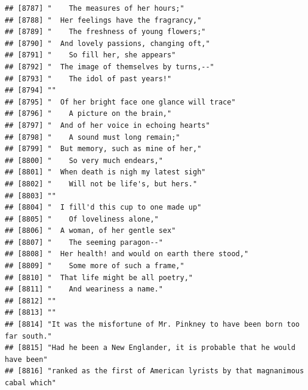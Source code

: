 \documentclass{article}\usepackage[]{graphicx}\usepackage[]{color}
\makeatletter
\newenvironment{kframe}{%
 \def\at@end@of@kframe{}%
 \ifinner\ifhmode%
  \def\at@end@of@kframe{\end{minipage}}%
  \begin{minipage}{\columnwidth}%
 \fi\fi%
 \def\FrameCommand##1{\hskip\@totalleftmargin \hskip-\fboxsep
 \colorbox{shadecolor}{##1}\hskip-\fboxsep
     \hskip-\linewidth \hskip-\@totalleftmargin \hskip\columnwidth}%
 \MakeFramed {\advance\hsize-\width
   \@totalleftmargin\z@ \linewidth\hsize
   \@setminipage}}%
 {\par\unskip\endMakeFramed%
 \at@end@of@kframe}
\newenvironment{knitrout}{}{} %
\makeatother
\begin{document}
\begin{knitrout}
\begin{kframe}
\begin{verbatim}
## [8787] "    The measures of her hours;"                                              
## [8788] "  Her feelings have the fragrancy,"                                          
## [8789] "    The freshness of young flowers;"                                         
## [8790] "  And lovely passions, changing oft,"                                        
## [8791] "    So fill her, she appears"                                                
## [8792] "  The image of themselves by turns,--"                                       
## [8793] "    The idol of past years!"                                                 
## [8794] ""                                                                            
## [8795] "  Of her bright face one glance will trace"                                  
## [8796] "    A picture on the brain,"                                                 
## [8797] "  And of her voice in echoing hearts"                                        
## [8798] "    A sound must long remain;"                                               
## [8799] "  But memory, such as mine of her,"                                          
## [8800] "    So very much endears,"                                                   
## [8801] "  When death is nigh my latest sigh"                                         
## [8802] "    Will not be life's, but hers."                                           
## [8803] ""                                                                            
## [8804] "  I fill'd this cup to one made up"                                          
## [8805] "    Of loveliness alone,"                                                    
## [8806] "  A woman, of her gentle sex"                                                
## [8807] "    The seeming paragon--"                                                   
## [8808] "  Her health! and would on earth there stood,"                               
## [8809] "    Some more of such a frame,"                                              
## [8810] "  That life might be all poetry,"                                            
## [8811] "    And weariness a name."                                                   
## [8812] ""                                                                            
## [8813] ""                                                                            
## [8814] "It was the misfortune of Mr. Pinkney to have been born too far south."       
## [8815] "Had he been a New Englander, it is probable that he would have been"         
## [8816] "ranked as the first of American lyrists by that magnanimous cabal which"     

\end{verbatim}
\end{kframe}
\end{knitrout}
\end{document}
